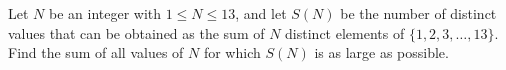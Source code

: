 Let $N$ be an integer with $1\le N\le13$, and let $S(N)$ be the number of distinct values that can be obtained as the sum of $N$ distinct elements of $\{1,2,3,\dots,13\}$. Find the sum of all values of $N$ for which $S(N)$ is as large as possible.
